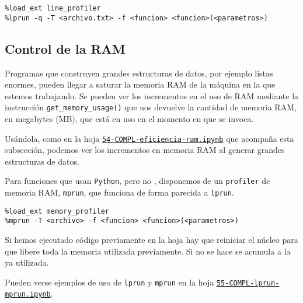 \begin{lstlisting}
%load_ext line_profiler
%lprun -q -T <archivo.txt> -f <funcion> <funcion>(<parametros>)
\end{lstlisting}




\subsection{Control de la RAM}

Programas que construyen grandes estructuras de datos, por ejemplo listas
enormes, pueden llegar a saturar la memoria RAM de la m\'aquina en la que
estemos trabajando. Se pueden ver los incrementos en el uso de RAM mediante la
instrucci\'on 
\lstinline|get_memory_usage()| que nos devuelve la cantidad de memoria RAM, en
megabytes (MB), que est\'a en uso en el momento en que se invoca. 

Us\'andola, como en la hoja 
\href{http://localhost:8888/notebooks/PROGR/COMPL/54-COMPL-eficiencia-ram.ipynb}{\tt 54-COMPL-eficiencia-ram.ipynb}
que acompa\~na
esta subsecci\'on,  podemos ver los
incrementos en memoria RAM al generar grandes estructuras de datos. 



Para funciones que usan \lstinline|Python|, pero no {\sage},    disponemos de un {\tt profiler} de memoria RAM, \lstinline|mprun|,  que funciona de forma parecida a \lstinline|lprun|. 


\begin{lstlisting}
%load_ext memory_profiler
%mprun -T <archivo> -f <funcion> <funcion>(<parametros>)
\end{lstlisting}

Si hemos ejecutado c\'odigo previamente en la hoja hay que reiniciar el n\'ucleo para que libere toda la memoria utilizada previamente. Si no se hace se acumula a la ya utilizada.

Pueden verse ejemplos de uso de  \lstinline|lprun| y \lstinline|mprun| en la hoja \href{http://localhost:8888/notebooks/PROGR/COMPL/55-COMPL-lprun-mprun.ipynb}{\tt 55-COMPL-lprun-mprun.ipynb}.


